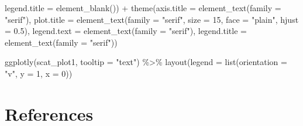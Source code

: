 \documentclass[
]{article}
\newenvironment{Shaded}{\begin{snugshade}}{\end{snugshade}}
\newcommand{\AttributeTok}[1]{\textcolor[rgb]{0.77,0.63,0.00}{#1}}
\newcommand{\DecValTok}[1]{\textcolor[rgb]{0.00,0.00,0.81}{#1}}
\newcommand{\FloatTok}[1]{\textcolor[rgb]{0.00,0.00,0.81}{#1}}
\newcommand{\FunctionTok}[1]{\textcolor[rgb]{0.00,0.00,0.00}{#1}}
\newcommand{\NormalTok}[1]{#1}
\newcommand{\SpecialCharTok}[1]{\textcolor[rgb]{0.00,0.00,0.00}{#1}}
\newcommand{\StringTok}[1]{\textcolor[rgb]{0.31,0.60,0.02}{#1}}
\begin{document}
\begin{Shaded}
\begin{Highlighting}[]
        \AttributeTok{legend.title =} \FunctionTok{element\_blank}\NormalTok{()) }\SpecialCharTok{+} \FunctionTok{theme}\NormalTok{(}\AttributeTok{axis.title =} \FunctionTok{element\_text}\NormalTok{(}\AttributeTok{family =} \StringTok{"serif"}\NormalTok{),}
    \AttributeTok{plot.title =} \FunctionTok{element\_text}\NormalTok{(}\AttributeTok{family =} \StringTok{"serif"}\NormalTok{,}
        \AttributeTok{size =} \DecValTok{15}\NormalTok{, }\AttributeTok{face =} \StringTok{"plain"}\NormalTok{, }\AttributeTok{hjust =} \FloatTok{0.5}\NormalTok{),}
    \AttributeTok{legend.text =} \FunctionTok{element\_text}\NormalTok{(}\AttributeTok{family =} \StringTok{"serif"}\NormalTok{),}
    \AttributeTok{legend.title =} \FunctionTok{element\_text}\NormalTok{(}\AttributeTok{family =} \StringTok{"serif"}\NormalTok{))}

\FunctionTok{ggplotly}\NormalTok{(scat\_plot1, }\AttributeTok{tooltip =} \StringTok{"text"}\NormalTok{) }\SpecialCharTok{\%\textgreater{}\%}
  \FunctionTok{layout}\NormalTok{(}\AttributeTok{legend =} \FunctionTok{list}\NormalTok{(}\AttributeTok{orientation =} \StringTok{"v"}\NormalTok{, }\AttributeTok{y =} \DecValTok{1}\NormalTok{,}
                       \AttributeTok{x =} \DecValTok{0}\NormalTok{))}
\end{Highlighting}
\end{Shaded}

\hypertarget{references}{%
\section*{References}\label{references}}
\end{document}
